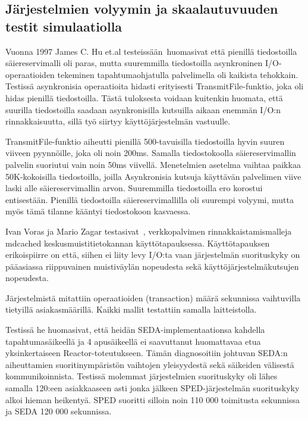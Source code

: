 \documentclass[finnish]{tktltiki2}
\theoremstyle{definition}
\theoremstyle{remark}
\begin{document}
\subsection{Järjestelmien volyymin ja skaalautuvuuden testit simulaatiolla}
Vuonna 1997 James C. Hu et.al testeissään~\cite{hu_measuring_1997}huomasivat
että pienillä tiedostoilla säiereservimalli oli paras,
mutta suuremmilla tiedostoilla asynkroninen I/O-operaatioiden
tekeminen tapahtumaohjatulla palvelimella oli kaikista tehokkain.
Testissä asynkronisia operaatioita hidasti
erityisesti TransmitFile-funktio, joka oli
hidas pienillä tiedostoilla.
Tästä tuloksesta voidaan kuitenkin huomata,
että suurilla tiedostoilla saadaan asynkronisilla
kutsuilla aikaan enemmän I/O:n rinnakkaisuutta, sillä
työ siirtyy käyttöjärjestelmän vastuulle.

TransmitFile-funktio aiheutti pienillä 500-tavuisilla tiedostoilla hyvin suuren viiveen
pyynnöille, joka oli noin 200ms. Samalla tiedostokoolla säiereservimallin palvelin
suoriutui vain noin 50ms viivellä. Menetelmien asetelma vaihtaa paikkaa
50K-kokoisilla tiedostoilla, joilla Asynkronisia kutsuja käyttävän
palvelimen viive laski alle säiereservimallin arvon. Suuremmilla tiedostoilla
ero korostui entisestään. Pienillä tiedostoilla säiereservimallilla oli suurempi
volyymi, mutta myös tämä tilanne kääntyi tiedostokoon kasvaessa.


Ivan Voras ja Mario Zagar testasivat~\cite{voras_characteristics_2009},
verkkopalvimen rinnakkaistamismalleja mdcached keskusmuistitietokannan
käyttötapauksessa. Käyttötapauksen erikoispiirre on että, siihen ei liity levy I/O:ta
vaan järjestelmän suorituskyky on pääasiassa riippuvainen muistiväylän nopeudesta sekä
käyttöjärjestelmäkutsujen nopeudesta.

Järjestelmistä mitattiin operaatioiden (transaction) määrä sekunnissa vaihtuvilla tietyillä
asiakasmäärillä. Kaikki mallit testattiin samalla laitteistolla.

Testissä he huomasivat,
että heidän SEDA-implementaationsa kahdella tapahtumasäikeellä ja 4 apusäikeellä
ei saavuttanut huomattavaa
etua yksinkertaiseen Reactor-toteutukseen. Tämän diagnosoitiin
johtuvan SEDA:n aiheuttamien suoritinympäristön vaihtojen yleisyydestä 
sekä säikeiden välisestä kommunikoinnista.
Testissä molemmat järjestelmien suorituskyky
oli lähes samalla 120:een asiakkaaseen asti jonka
jälkeen SPED-järjestelmän suorituskyky alkoi
hieman heikentyä. SPED suoritti silloin noin 110 000 toimitusta sekunnissa
ja SEDA 120 000 sekunnissa.
\end{document}
